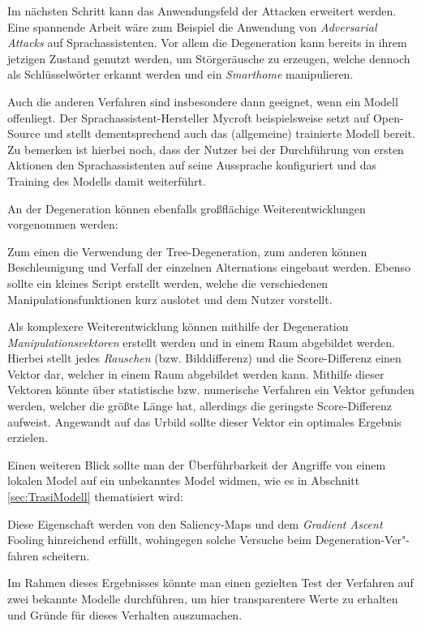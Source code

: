 Im nächsten Schritt kann das Anwendungsfeld der Attacken erweitert werden. Eine spannende Arbeit wäre zum Beispiel die Anwendung von \textit{Adversarial Attacks} auf Sprachassistenten. 
Vor allem die Degeneration kann bereits in ihrem jetzigen Zustand genutzt werden, um Störgeräusche zu erzeugen, welche dennoch als Schlüsselwörter erkannt werden und ein \textit{Smarthome} manipulieren. 

Auch die anderen Verfahren sind insbesondere dann geeignet, wenn ein Modell offenliegt. Der Sprachassistent-Hersteller Mycroft beispielsweise setzt auf Open-Source und stellt dementsprechend auch das (allgemeine) trainierte Modell bereit. 
Zu bemerken ist hierbei noch, dass der Nutzer bei der Durchführung von ersten Aktionen den Sprachassistenten auf seine Aussprache konfiguriert und das Training des Modells damit weiterführt.  

An der Degeneration können ebenfalls großflächige Weiterentwicklungen vorgenommen werden: 

Zum einen die Verwendung der Tree-Degeneration, zum anderen können Beschleunigung und Verfall der einzelnen Alternations eingebaut werden. Ebenso sollte ein kleines Script erstellt werden, welche die verschiedenen Manipulationsfunktionen kurz auslotet und dem Nutzer vorstellt. 

Als komplexere Weiterentwicklung können mithilfe der Degeneration \textit{Manipulationsvektoren} erstellt werden und in einem Raum abgebildet werden. Hierbei stellt jedes \textit{Rauschen} (bzw. Bilddifferenz) und die Score-Differenz einen Vektor dar, welcher in einem Raum abgebildet werden kann. Mithilfe dieser Vektoren könnte über statistische bzw. numerische Verfahren ein Vektor gefunden werden, welcher die größte Länge hat, allerdings die geringste Score-Differenz aufweist. Angewandt auf das Urbild sollte dieser Vektor ein optimales Ergebnis erzielen.  

Einen weiteren Blick sollte man der Überführbarkeit der Angriffe von einem lokalen Model auf ein unbekanntes Model widmen, wie es in Abschnitt \ref{sec:TrasiModell} thematisiert wird: 

Diese Eigenschaft werden von den Saliency-Maps und dem \textit{Gradient Ascent} Fooling hinreichend erfüllt, wohingegen solche Versuche beim Degeneration-Ver"-fahren scheitern. 

Im Rahmen dieses Ergebnisses könnte man einen gezielten Test der Verfahren auf zwei bekannte Modelle durchführen, um hier transparentere Werte zu erhalten und Gründe für dieses Verhalten auszumachen. 

